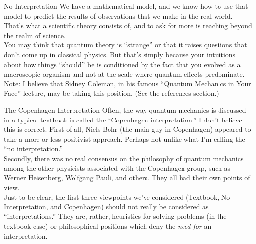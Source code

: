 \documentclass[9pt,usenames,dvipsnames]{beamer}
\begin{document}
\begin{frame}[t]{No Interpretation}
  \vspace{12pt}
  We have a mathematical model, and we know how to use that model to
  predict the results of observations that we make in the real world.
  That's what a scientific theory consists of, and to ask for more
  is reaching beyond the realm of science.
  \vspace{8pt}\\
  You may think that quantum theory is ``strange'' or that it raises
  questions that don't come up in classical physics. But that's simply
  because your intuitions about how things ``should'' be is conditioned
  by the fact that you evolved as a macroscopic organism and not at
  the scale where quantum effects predominate.
  \vspace{8pt}\\
  Note: I believe that Sidney Coleman, in his famous 
  ``Quantum Mechanics in Your Face'' lecture, may be taking this position.
  (See the references section.)
\end{frame}

\begin{frame}[t]{The Copenhagen Interpretation}
  \vspace{12pt}
  Often, the way quantum mechanics is discussed in a typical textbook is
  called the ``Copenhagen interpretation.'' I don't believe this is correct.
  First of all, Niels Bohr (the main guy in Copenhagen) appeared
  to take a more-or-less positivist approach. Perhaps not unlike what I'm
  calling the ``no interpretation.''
  \vspace{8pt}\\
  Secondly, there was no real consensus on the philosophy of quantum mechanics
  among the other physicists associated with the Copenhagen group, such as
  Werner Heisenberg, Wolfgang Pauli, and others. They all had their own
  points of view.
  \vspace{8pt}\\
  Just to be clear, the first three viewpoints we've considered (Textbook,
  No Interpretation, and Copenhagen) should not really be considered as
  ``interpretations.'' They are, rather, heuristics for solving problems
  (in the textbook case) or philosophical positions which deny the 
  {\it need for} an interpretation. 

\end{frame}
\end{document}
